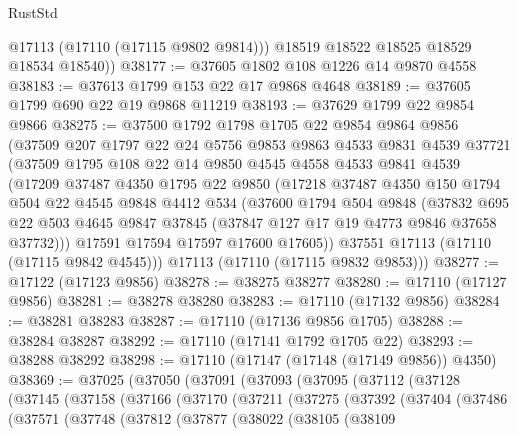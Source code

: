 \begin{lexlean}{RustStd}
\begin{coremodule}
          @17113
          (@17110 (@17115 @9802 @9814)))
        @18519
        @18522
        @18525
        @18529
        @18534
        @18540))
@38177 := @37605 @1802 @108 @1226 @14 @9870 @4558
@38183 := @37613 @1799 @153 @22 @17 @9868 @4648
@38189 := @37605 @1799 @690 @22 @19 @9868 @11219
@38193 := @37629 @1799 @22 @9854 @9866
@38275 := @37500
    @1792
    @1798
    @1705
    @22
    @9854
    @9864
    @9856
    (@37509
      @207
      @1797
      @22
      @24
      @5756
      @9853
      @9863
      @4533
      @9831
      @4539
      @37721
      (@37509
        @1795
        @108
        @22
        @14
        @9850
        @4545
        @4558
        @4533
        @9841
        @4539
        (@17209
          @37487
          @4350
          @1795
          @22
          @9850
          (@17218
            @37487
            @4350
            @150
            @1794
            @504
            @22
            @4545
            @9848
            @4412
            @534
            (@37600
              @1794
              @504
              @9848
              (@37832
                @695
                @22
                @503
                @4645
                @9847
                @37845
                (@37847 @127 @17 @19 @4773 @9846 @37658 @37732)))
            @17591
            @17594
            @17597
            @17600
            @17605))
        @37551
        @17113
        (@17110 (@17115 @9842 @4545)))
      @17113
      (@17110 (@17115 @9832 @9853)))
@38277 := @17122 (@17123 @9856)
@38278 := @38275 @38277
@38280 := @17110 (@17127 @9856)
@38281 := @38278 @38280
@38283 := @17110 (@17132 @9856)
@38284 := @38281 @38283
@38287 := @17110 (@17136 @9856 @1705)
@38288 := @38284 @38287
@38292 := @17110 (@17141 @1792 @1705 @22)
@38293 := @38288 @38292
@38298 := @17110 (@17147 (@17148 (@17149 @9856)) @4350)
@38369 := @37025
    (@37050
      (@37091
        (@37093
          (@37095
            (@37112
              (@37128
                (@37145
                  (@37158
                    (@37166
                      (@37170
                        (@37211
                          (@37275
                            (@37392
                              (@37404
                                (@37486
                                  (@37571
                                    (@37748
                                      (@37812
                                        (@37877
                                          (@38022
                                            (@38105
                                              (@38109

\end{coremodule}
\end{lexlean}
